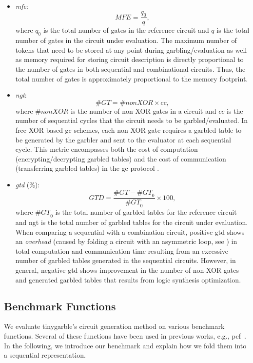 \begin{itemize}
\item \textit{\acrfull{mfe}}: $$\mathit{MFE} = \dfrac{q_{0}}{q},$$ where $q_{0}$ is the total number of gates in the reference circuit and $q$ is the total number of gates in the circuit under evaluation.
		The maximum number of tokens that need to be stored at any point during garbling/evaluation as well as memory required for storing circuit description is directly proportional to the number of gates in both sequential and combinational circuits.
		Thus, the total number of gates is approximately proportional to the memory footprint.

\item \textit{\acrfull{ngt}}: $$\mathit{\#GT} = \#nonXOR\times cc,$$ where $\#nonXOR$ is the number of non-XOR gates in a circuit and $cc$ is the number of sequential cycles that the circuit needs to be garbled/evaluated.
		In free XOR-based \acrshort{gc} schemes, each non-XOR gate requires a garbled table to be generated by the garbler and sent to the evaluator at each sequential cycle.
		This metric encompasses both the cost of computation (encrypting/decrypting garbled tables) and the cost of communication (transferring garbled tables) in the \acrshort{gc} protocol \cite{kolesnikov2008improved}.

\item \textit{\acrfull{gtd}} (\%): $$\mathit{GTD} = \dfrac{\mathit{\#GT} - \mathit{\#GT}_{0}}{\mathit{\#GT}_{0}} \times 100,$$ where $\mathit{\#GT}_{0}$ is the total number of garbled tables for the reference circuit and \acrshort{ngt} is the total number of garbled tables for the circuit under evaluation.
		When comparing a sequential with a combination circuit, positive \acrshort{gtd} shows an \emph{overhead} (caused by folding a circuit with an asymmetric loop, see ) in total computation and communication time resulting from an excessive number of garbled tables generated in the sequential circuits.
		However, in general, negative \acrshort{gtd} shows improvement in the number of non-XOR gates and generated garbled tables that results from logic synthesis optimization.
\end{itemize}

\subsection{Benchmark Functions}\label{ssec:eval-tinygarble-benchmark}
We evaluate \gls{tinygarble}'s circuit generation method on various benchmark functions.
Several of these functions have been used in previous works, e.g., \gls{pcf}~\cite{kreuter2013pcf}.
In the following, we introduce our benchmark and explain how we fold them into a sequential representation.

